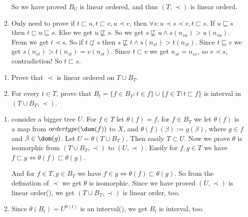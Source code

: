 \documentclass{ctexart}
\begin{document}
\begin{solution}
\begin{enumerate}
      So we have proved \(B_U\) is linear ordered, and thus \((T,\prec)\) is linear orderd. 
    \item Only need to prove if \(t \sqsubset u,t \sqsubset v,u \prec v\), then \(\forall s:u \prec s \prec v,t \sqsubset s\). 
      If \(u \sqsubseteq s\) then \(t \sqsubset u \sqsubseteq s\). 
      Else we get \(u \not \sqsubseteq s\). So we get \(s \not \sqsubseteq u \wedge s(n_{su})>u(n_{su})\). 
      From  we get \(t \prec s\). So if \(t \not \sqsubset s \) then \(s \not \sqsubseteq t \wedge s(n_{st})>t(n_{st})\). 
      Since \(t \sqsubseteq v\) we get \(s(n_{st})>t(n_{st})=v(n_{st})\). 
      Since \(t \sqsubset v\) we get \(n_{st}=n_{sv}\), so \(v \prec s\), contradiction! 
      So \(t \sqsubset s\). 
  \end{enumerate}
\end{solution}

\begin{problem}
  \begin{enumerate}
    \item Prove that \(\prec\) is linear ordered on \(T \cup B_T\). 
    \item For every \(t \in T\), prove that \(B_t = \{f \in B_T:t \in f\}\cup\{f \in T:t \sqsubset f\}\) is interval in \((T \cup B_T,\prec)\). 
  \end{enumerate}
\end{problem}

\begin{solution}
  \begin{enumerate}
    \item consider a bigger tree \(U\). For \(f \in T\) let \(\theta(f)= f\), for \(f \in B_T\) we let \(\theta(f)\) is a map 
      from \(ordertype(\dom(f))\) to \(X\), and \(\theta(f)(\beta):=g(\beta)\), where \(g \in f \) and \(\beta \in \dom(g)\). 
      Let \(U=\theta(T \cup B_T)\). Then easily \(T \subset U\). Now we prove \(\theta\) is isomorphic from \((T \cup B_T,\prec)\) to \((U,\prec)\). 
      Easily for \(f,g \in T\) we have \(f \sqsubset g \iff \theta(f) \sqsubset \theta(g)\). 
 
      And for \(f \in T,g \in B_T\) we have \(f \in g \iff \theta(f)\sqsubset \theta(g)\). 
      So from the defination of \(\prec\) we get \(\theta\) is isomorphic. 
      Since we have proved \((U,\prec)\) is linear order(), we get \((T \cup B_T,\prec)\) is linear order, too. 
    \item Since \(\theta(B_t)=U^{\theta(t)}\) is an interval(), we get \(B_t\) is interval, too.
  \end{enumerate}
  
\end{solution}
\end{document}
